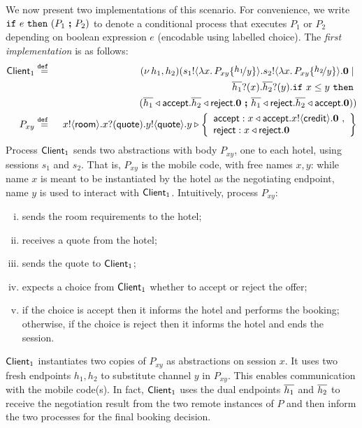 We now present two \HOp implementations of this scenario.
For convenience, we write $\mathtt{if}\  e\ \mathtt{then}\  (P_1\ \boldsymbol{;} \ P_2)$ 
to denote a conditional process that executes $P_1$ or $P_2$ depending on boolean expression $e$ (encodable using labelled choice).
The \emph{first implementation} is  as follows:
%
	\begin{eqnarray*}%
		 \Client_1   & \defeq  &  \newsp{h_1, h_2}{\bout{s_1}{\abs{x}{P_{xy} \subst{h_1}{y}}} \bout{s_2}{\abs{x}{P_{xy} \subst{h_2}{y}}} \inact \Par  \\
		& & 
		\qquad \qquad\binp{\dual{h_1}}{x} \binp{\dual{h_2}}{y}  \If x \leq y\   \Then\\
		& & \qquad\qquad \qquad \qquad (\bsel{\dual{h_1}}{\accept} \bsel{\dual{h_2}}{\reject} \inact \ \Else \ \bsel{\dual{h_1}}{\reject} \bsel{\dual{h_2}}{\accept} \inact )
		}
		\\
				 P_{xy}    & \defeq &    \bout{x}{\rtype} \binp{x}{\Quote} \bout{y}{\Quote}
		y \triangleright \left\{
				\begin{array}{l}
					\accept: \bsel{x}{\accept} \bout{x}{\creditc} \inact~,\\
					\reject: \bsel{x}{\reject} \inact
				\end{array}
				\right\}
	\end{eqnarray*}
%
Process $\mathsf{Client}_1$ sends two abstractions with body $P_{xy}$, one to each hotel, 
		using sessions $s_1$ and $s_2$.
		That is, $P_{xy}$ is the mobile code, with free names $x, y$:
	while
		name $x$ is meant to be instantiated by the hotel as the negotiating
		endpoint, name $y$ is used to interact with $\mathsf{Client}_1$.	
		Intuitively, process $P_{xy}$:
		\begin{enumerate}[(i)]
		 \item sends the room requirements to the hotel;
		\item  receives a quote from the hotel;
		\item  sends the quote to  $\mathsf{Client}_1$;
		\item expects a choice from   $\mathsf{Client}_1$ whether to accept or reject the offer;
		\item if the choice is accept then it informs the hotel and performs the booking;
		otherwise, if the choice is reject then it informs the hotel and ends the session.
		\end{enumerate}
				$\mathsf{Client}_1$ instantiates two copies of  $P_{xy}$ as abstractions
		on session $x$. It uses two
		fresh endpoints $h_1, h_2$ to substitute channel $y$
		in $P_{xy}$. This enables communication with the mobile code(s).
		In fact, 
		$\mathsf{Client}_1$ uses the dual endpoints $\overline{h_1}$ and $\overline{h_2}$
		to receive the negotiation
		result from the two remote instances of $P$ and then inform the two
		processes for the final booking decision.

